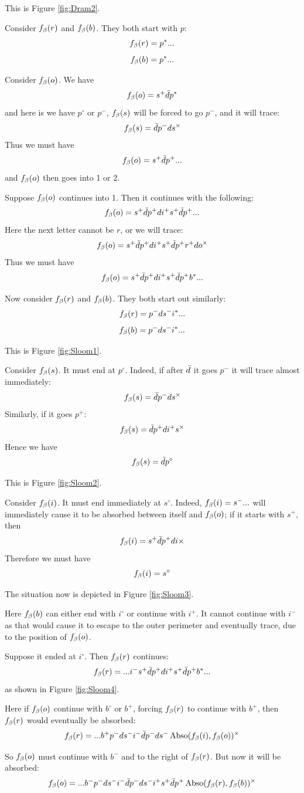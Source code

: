 This is Figure \ref{fig:Dram2}.

Consider $f_\beta(r)$ and $f_\beta(b)$. They both start with $p$:
\[
f_\beta(r) = p^*...
\]
\[
f_\beta(b) = p^*...
\]

Consider $f_\beta(o)$. We have
\[
f_\beta(o) = s^+ \bar{d}  p^*
\]
and here is we have $p^\circ$ or $p^-$, $f_\beta(s)$ will be forced to go $p^-$, and it will trace:
\[
f_\beta(s) = \bar{d} p^- d s^\times
\]
Thus we must have
\[
f_\beta(o) = s^+ \bar{d}  p^+...
\]
and $f_\beta(o)$ then goes into 1 or 2. 

\label{Sloom}
Suppose $f_\beta(o)$ continues into 1. Then it continues with the following:
\[
f_\beta(o) = s^+ \bar{d} p^+ d i^+ s^+ \bar{d} p^+...
\]
Here the next letter cannot be $r$, or we will trace:
\[
f_\beta(o) = s^+ \bar{d} p^+ d i^+ s^+ \bar{d} p^+ r^+ d o^\times
\]
Thus we must have
\[
f_\beta(o) = s^+ \bar{d} p^+ d i^+ s^+ \bar{d} p^+ b^*...
\]

Now consider $f_\beta(r)$ and $f_\beta(b)$. They both start out similarly:
\[
f_\beta(r) = p^- d s^- i^*...
\]
\[
f_\beta(b) = p^- d s^- i^*...
\]

This is Figure \ref{fig:Sloom1}.

Consider $f_\beta(s)$. It must end at $p^\circ$. Indeed, if after $\bar{d}$ it goes  $p^-$ it will trace almost immediately:
\[
f_\beta(s) = \bar{d} p^- d s^\times
\]
Similarly, if it goes $p^+$:
\[
f_\beta(s) = \bar{d} p^+ d i^+ s^\times
\]
Hence we have
\[
f_\beta(s) = \bar{d} p^\circ
\]

This is Figure \ref{fig:Sloom2}.

Consider $f_\beta(i)$. It must end immediately at $s^\circ$. Indeed, $f_\beta(i) = s^-...$ will immediately cause it to be absorbed between itself and $f_\beta(o)$; if it starts with $s^+$, then
\[
f_\beta(i) = s^+ \bar{d} p^+ d i\times
\]
Therefore we must have
\[
f_\beta(i) = s^\circ
\]

The situation now is depicted in Figure \ref{fig:Sloom3}.

Here $f_\beta(b)$ can either end with $i^\circ$ or continue with $i^+$. It cannot continue with $i^-$ as that would cause it to escape to the outer perimeter and eventually trace, due to the position of $f_\beta(o)$. 

Suppose it ended at $i^\circ$. Then $f_\beta(r)$ continues:
\[
f_\beta(r) = ...i^- s^+ \bar{d} p^+ d i^+ s^+ \bar{d} p^+ b^*...
\]
as shown in Figure \ref{fig:Sloom4}.

Here if $f_\beta(o)$ continue with $b^\circ$ or $b^+$, forcing $f_\beta(r)$ to continue with $b^+$, then $f_\beta(r)$ would eventually be absorbed:
\[
f_\beta(r) = ...b^+ p^- d s^- i^- \bar{d} p^- d s^- \operatorname{Abso}(f_\beta(i), f_\beta(o))^\times
\]

So $f_\beta(o)$ must continue with $b^-$ and to the right of $f_\beta(r)$. But now it will be absorbed:
\[
f_\beta(o) = ...b^- p^- d s^- i^- \bar{d} p^-d s^- i^+ s^+ \bar{d} p^+ \operatorname{Abso}(f_\beta(r), f_\beta(b))^\times
\]

